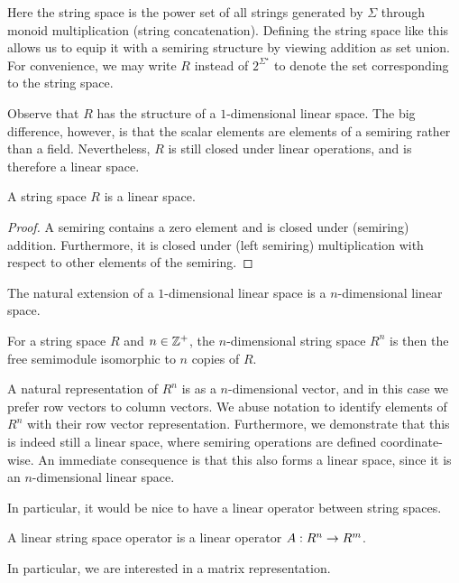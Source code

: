 Here the string space is the power set of all strings generated
by \(\Sigma\) through monoid multiplication (string concatenation).
Defining the string space like this allows us to equip it with a semiring
structure by viewing addition as set union.
For convenience,
we may write \(R\) instead of \(2^{\Sigma^\star}\)
to denote the set corresponding to the string space.

Observe that \(R\) has the structure of a \(1\)-dimensional linear space.
The big difference, however, is that the scalar elements are
elements of a semiring rather than a field.
Nevertheless, \(R\) is still closed under linear operations,
and is therefore a linear space.

\begin{theorem}
  A string space \(R\) is a linear space.
\end{theorem}
\begin{proof}
  A semiring contains a zero element and is closed under
  (semiring) addition.
  Furthermore,
  it is closed under (left semiring) multiplication
  with respect to other elements of the semiring.
\end{proof}

The natural extension of a \(1\)-dimensional linear space
is a \(n\)-dimensional linear space.

\begin{definition}
  For a string space \(R\) and \(n \in \mathbb{Z}^{+}\),
  the \(n\)-dimensional string space \(R^n\) is then the
  free semimodule isomorphic to \(n\) copies of \(R\).
\end{definition}

A natural representation of \(R^n\) is as a \(n\)-dimensional vector,
and in this case we prefer row vectors to column vectors.
We abuse notation to identify elements of \(R^n\) with their
row vector representation.
Furthermore, we demonstrate that this is indeed still a linear space,
where semiring operations are defined coordinate-wise.
An immediate consequence is that this also forms a linear space,
since it is an \(n\)-dimensional linear space.


In particular, it would be nice to have a linear operator
between string spaces.

\begin{definition}
  A linear string space operator
  is a linear operator \(A : R^n \to R^m\).
\end{definition}

In particular, we are interested in a matrix representation.

